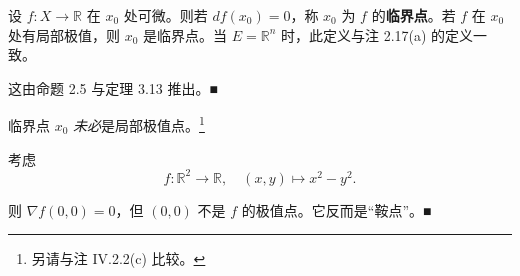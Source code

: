 \begin{remark}

\begin{items}
\item

设 $ f : X \to \mathbb{R} $ 在 $ x_0 $ 处可微。则若 $ df(x_0) = 0 $，称 $ x_0 $ 为 $ f $ 的\textbf{临界点}。若 $ f $ 在 $ x_0 $ 处有局部极值，则 $ x_0 $ 是临界点。当 $ E = \mathbb{R}^n $ 时，此定义与注 2.17(a) 的定义一致。

\proofhead
这由命题 2.5 与定理 3.13 推出。\nobreak\hspace{0.35em}■
\item

临界点 $ x_0 $ \emph{未必}是局部极值点。\footnote{另请与注 IV.2.2(c) 比较。}

\proofhead
考虑
\[
f : \mathbb{R}^2 \to \mathbb{R} , \quad (x, y) \mapsto x^2 - y^2 .
\]

则 $ \nabla f(0, 0) = 0 $，但 $ (0, 0) $ 不是 $ f $ 的极值点。它反而是“鞍点”。\nobreak\hspace{0.35em}■

\end{items}

\end{remark}

\exerciseshead

